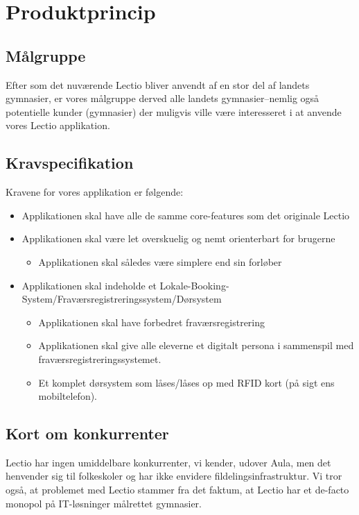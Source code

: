 \section{Produktprincip}
    \subsection{Målgruppe}
    Efter som det nuværende Lectio bliver anvendt af en stor del af landets gymnasier, er vores målgruppe derved alle landets gymnasier--nemlig også potentielle kunder (gymnasier) der
    muligvis ville være interesseret i at anvende vores Lectio applikation. 
    

    \subsection{Kravspecifikation}
    Kravene for vores applikation er følgende: 
    
    \begin{itemize}
        \item Applikationen skal have alle de samme core-features som det originale Lectio
        \item Applikationen skal være let overskuelig og nemt orienterbart for brugerne
        \begin{itemize}
            \item Applikationen skal således være simplere end sin forløber
        \end{itemize}
        \item Applikationen skal indeholde et Lokale-Booking-System/Fraværsregistreringssystem/Dørsystem 
        \begin{itemize}
            \item Applikationen skal have forbedret fraværsregistrering
            \item Applikationen skal give alle eleverne et digitalt persona i sammenspil med fraværsregistreringssystemet. 
            \item Et komplet dørsystem som låses/låses op med RFID kort (på sigt ens mobiltelefon). 
        \end{itemize}
    \end{itemize}

    \subsection{Kort om konkurrenter}
        Lectio har ingen umiddelbare konkurrenter, vi kender, udover Aula, men det henvender sig til folkeskoler og har ikke envidere fildelingsinfrastruktur. Vi tror også, at problemet med Lectio stammer fra det faktum, at Lectio har et de-facto monopol på IT-løsninger målrettet gymnasier.

